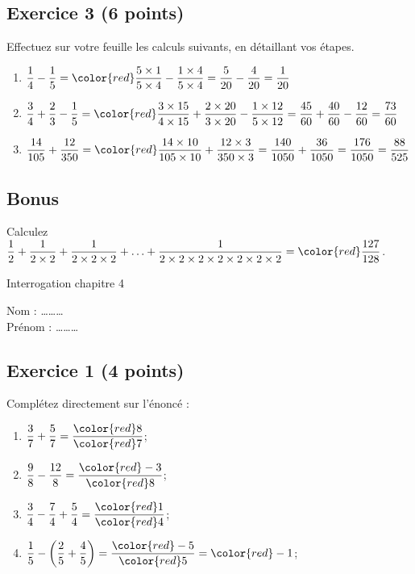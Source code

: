 \documentclass[14 pt]{extarticle}
\theoremstyle{plain}
\begin{document}
\subsection*{Exercice 3 (6 points)}

Effectuez sur votre feuille les calculs suivants, en détaillant vos étapes. 

\begin{enumerate}
\item $\displaystyle \frac14 - \frac15 = \color{red} \frac{5\times 1}{5\times4} - \frac{1\times4}{5\times 4} = \frac5{20}-\frac4{20} = \frac1{20}$ 

\item $\displaystyle \frac34 + \frac23 - \frac15
= \color{red} \frac{3\times15}{4\times15} + \frac{2\times20}{3\times 20}- \frac{1\times 12}{5\times12} = \frac{45}{60} + \frac{40}{60} - \frac{12}{60} = \frac{73}{60}$  

\item $\displaystyle \frac{14}{105} + \frac{12}{350} = \color{red} 
\frac{14\times 10}{105\times 10} + \frac{12\times 3}{350\times3} = \frac{140}{1050} + \frac{36}{1050} = \frac{176}{1050} = \frac{88}{525}$ 
\end{enumerate}

\subsection*{Bonus}
Calculez $\displaystyle \frac12 + \frac1{2 \times 2} + \frac1{2\times 2 \times 2} + \ldots + \frac1{2\times 2\times 2 \times 2 \times 2 \times 2 \times 2}= \color{red}\frac{127}{128}$.

\newpage 


\begin{center}{\Large Interrogation chapitre 4}\\ 
 \end{center}
 
 Nom : \ldots\ldots\ldots\\
 Prénom : \ldots\ldots\ldots
 
  \subsection*{Exercice 1 (4 points)}
 Complétez directement sur l'énoncé : 
 \begin{enumerate}
 \item $\displaystyle\frac37 + \frac57 =\frac{\color{red}8}{\color{red}7}$;
 \item $\displaystyle\frac98 - \frac{12}8 = \frac{\color{red}-3}{\color{red}8}$;
 \item $\displaystyle\frac34 - \frac74  + \frac54 = \frac{\color{red}1}{\color{red}4}$;
 \item $\displaystyle\frac15 - \left(\frac25 + \frac45\right) =\frac{\color{red}-5}{\color{red}5} = \color{red} -1$;
 \end{enumerate}
 
\end{document}
